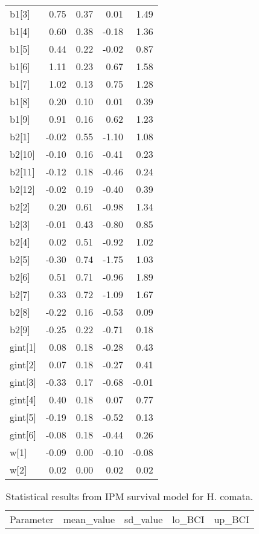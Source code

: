 \documentclass[12pt,]{article}
\begin{document}
\begin{table}[ht]
{\begin{tabular}{lrrrr}
  b1[3] & 0.75 & 0.37 & 0.01 & 1.49 \\ 
  b1[4] & 0.60 & 0.38 & -0.18 & 1.36 \\ 
  b1[5] & 0.44 & 0.22 & -0.02 & 0.87 \\ 
  b1[6] & 1.11 & 0.23 & 0.67 & 1.58 \\ 
  b1[7] & 1.02 & 0.13 & 0.75 & 1.28 \\ 
  b1[8] & 0.20 & 0.10 & 0.01 & 0.39 \\ 
  b1[9] & 0.91 & 0.16 & 0.62 & 1.23 \\ 
  b2[1] & -0.02 & 0.55 & -1.10 & 1.08 \\ 
  b2[10] & -0.10 & 0.16 & -0.41 & 0.23 \\ 
  b2[11] & -0.12 & 0.18 & -0.46 & 0.24 \\ 
  b2[12] & -0.02 & 0.19 & -0.40 & 0.39 \\ 
  b2[2] & 0.20 & 0.61 & -0.98 & 1.34 \\ 
  b2[3] & -0.01 & 0.43 & -0.80 & 0.85 \\ 
  b2[4] & 0.02 & 0.51 & -0.92 & 1.02 \\ 
  b2[5] & -0.30 & 0.74 & -1.75 & 1.03 \\ 
  b2[6] & 0.51 & 0.71 & -0.96 & 1.89 \\ 
  b2[7] & 0.33 & 0.72 & -1.09 & 1.67 \\ 
  b2[8] & -0.22 & 0.16 & -0.53 & 0.09 \\ 
  b2[9] & -0.25 & 0.22 & -0.71 & 0.18 \\ 
  gint[1] & 0.08 & 0.18 & -0.28 & 0.43 \\ 
  gint[2] & 0.07 & 0.18 & -0.27 & 0.41 \\ 
  gint[3] & -0.33 & 0.17 & -0.68 & -0.01 \\ 
  gint[4] & 0.40 & 0.18 & 0.07 & 0.77 \\ 
  gint[5] & -0.19 & 0.18 & -0.52 & 0.13 \\ 
  gint[6] & -0.08 & 0.18 & -0.44 & 0.26 \\ 
  w[1] & -0.09 & 0.00 & -0.10 & -0.08 \\ 
  w[2] & 0.02 & 0.00 & 0.02 & 0.02 \\ 
   \hline
\end{tabular}
}
\end{table}\begin{table}[ht]
\centering
\caption{Statistical results from IPM survival model for H. comata.} 
{\footnotesize
\begin{tabular}{lrrrr}
  \hline
Parameter & mean\_value & sd\_value & lo\_BCI & up\_BCI \\ 

\end{tabular}}
\end{table}
\end{document}
